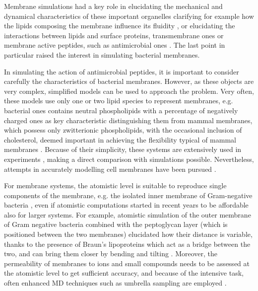 \documentclass[graybox]{svmult}
\begin{document}
Membrane simulations had a key role in elucidating the mechanical and dynamical characteristics of these important organelles clarifying for example how the lipids composing the membrane influence its fluidity \cite{Risselada2008,Song2019}, or elucidating the interactions between lipids and surface proteins, transmembrane ones or membrane active peptides, such as antimicrobial ones \cite{Leontiadou2006,Ulmschneider2017,Sun2015}. The last point in particular raised the interest in simulating bacterial membranes.

In simulating the action of antimicrobial peptides, it is important to consider carefully the characteristics of bacterial membranes. However, as these objects are very complex, simplified models can be used to approach the problem.
%
Very often, these models use only one or two lipid species to represent membranes, e.g. bacterial ones contains neutral phospholipids with a percentage of negatively charged ones \cite{Lipkin2017,Wang2012,Zhao2018,Chen2019} as key characteristic distinguishing them from mammal membranes, which possess only zwitterionic phospholipids, with the occasional inclusion of cholesterol, deemed important in achieving the flexibility typical of mammal membranes \cite{Lipkin2017,Wang2012,Zhao2018,Chen2019,Risselada2008}.
%
Because of their simplicity, these systems are extensively used in experiments \cite{Castelletto2016,Tang2009,Glukhov2005}, making a direct comparison with simulations possible. Nevertheless, attempts in accurately modelling cell membranes have been pursued \cite{Khalid2019}.

For membrane systems, the atomistic level is suitable to reproduce single components of the membrane, e.g. the isolated inner membrane of Gram-negative bacteria \cite{Piggot2011}, even if atomistic computations started in recent years to be affordable also for larger systems.
%
For example, atomistic simulation of the outer membrane of Gram negative bacteria combined with the peptoglycan layer (which is positioned between the two membranes) elucidated how their distance is variable, thanks to the presence of Braun's lipoproteins which act as a bridge between the two, and can bring them closer by bending and tilting \cite{Samsudin2017}.
%
Moreover, the permeability of membranes to ions and small compounds needs to be assessed at the atomistic level to get sufficient accuracy, and because of the intensive task, often enhanced MD techniques such as umbrella sampling are employed \cite{Carpenter2016}.
\end{document}
